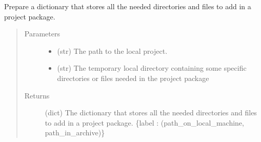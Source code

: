 \documentclass[a4paper,10pt,english]{sphinxmanual}
\begin{document}
\begin{fulllineitems}
\label{\detokenize{apidoc_commands/commands:commands.package.project_package}}
Prepare a dictionary that stores all the needed directories and files 
to add in a project package.
\begin{quote}\begin{description}
\item[{Parameters}] \leavevmode\begin{itemize}
\item {} 
 \textendash{} (str) The path to the local project.

\item {} 
 \textendash{} (str) 
The temporary local directory containing some specific directories
or files needed in the project package

\end{itemize}

\item[{Returns}] \leavevmode
(dict)
The dictionary that stores all the needed directories and files
to add in a project package.
\{label : (path\_on\_local\_machine, path\_in\_archive)\}

\end{description}\end{quote}

\end{fulllineitems}

\end{document}
